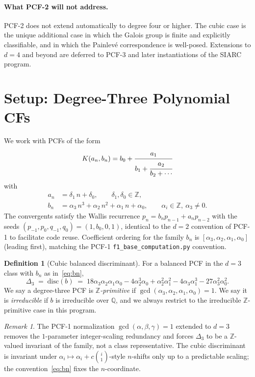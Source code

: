 \documentclass[11pt,a4paper]{article}
\theoremstyle{definition}
\newtheorem{definition}[conjecture]{Definition}
\theoremstyle{remark}
\newtheorem{remark}[conjecture]{Remark}
\newcommand{\Q}{\mathbb{Q}}
\newcommand{\Z}{\mathbb{Z}}
\newcommand{\disc}{\mathrm{disc}}
\begin{document}
\paragraph{What PCF-2 will not address.}
PCF-2 does not extend automatically to degree four or higher. The cubic
case is the unique additional case in which the Galois group is finite
and explicitly classifiable, and in which the Painlev\'e correspondence
is well-posed. Extensions to $d=4$ and beyond are deferred to PCF-3 and
later instantiations of the SIARC program.

\section{Setup: Degree-Three Polynomial CFs}\label{sec:setup}

We work with PCFs of the form
\begin{equation}\label{eq:pcfd3}
K(a_{n},b_{n})=b_{0}+\cfrac{a_{1}}{b_{1}+\cfrac{a_{2}}{b_{2}+\cdots}}
\end{equation}
with
\begin{align}
a_{n} &= \delta_{1}\,n + \delta_{0},\qquad \delta_{1},\delta_{0}\in\Z, \label{eq:an}\\
b_{n} &= \alpha_{3}\,n^{3} + \alpha_{2}\,n^{2} + \alpha_{1}\,n + \alpha_{0},\qquad \alpha_{i}\in\Z,\ \alpha_{3}\ne 0. \label{eq:bn}
\end{align}
The convergents satisfy the Wallis recurrence $p_{n}=b_{n}p_{n-1}+a_{n}p_{n-2}$
with the seeds $(p_{-1},p_{0},q_{-1},q_{0})=(1,b_{0},0,1)$, identical to
the $d=2$ convention of PCF-1 to facilitate code reuse. Coefficient
ordering for the family $b_{n}$ is $[\alpha_{3},\alpha_{2},\alpha_{1},\alpha_{0}]$
(leading first), matching the PCF-1 \texttt{f1\_base\_computation.py}
convention.

\begin{definition}[Cubic balanced discriminant]\label{def:Delta3}
For a balanced PCF in the $d=3$ class with $b_{n}$ as in~\eqref{eq:bn},
\[
\Delta_{3}\;=\;\disc(b)\;=\;
18\alpha_{3}\alpha_{2}\alpha_{1}\alpha_{0}
-4\alpha_{2}^{3}\alpha_{0}
+\alpha_{2}^{2}\alpha_{1}^{2}
-4\alpha_{3}\alpha_{1}^{3}
-27\alpha_{3}^{2}\alpha_{0}^{2}.
\]
We say a degree-three PCF is \emph{$\Z$-primitive} if
$\gcd(\alpha_{3},\alpha_{2},\alpha_{1},\alpha_{0})=1$. We say it is
\emph{irreducible} if $b$ is irreducible over $\Q$, and we always
restrict to the irreducible $\Z$-primitive case in this program.
\end{definition}

\begin{remark}\label{rem:primitive}
The PCF-1 normalization $\gcd(\alpha,\beta,\gamma)=1$ extended to $d=3$
removes the $1$-parameter integer-scaling redundancy and forces
$\Delta_{3}$ to be a $\Z$-valued invariant of the family, not a class
representative. The cubic discriminant is invariant under
$\alpha_{i}\mapsto\alpha_{i}+c\binom{i}{1}$-style $n$-shifts only up to a
predictable scaling; the convention~\eqref{eq:bn} fixes the
$n$-coordinate.
\end{remark}
\end{document}
